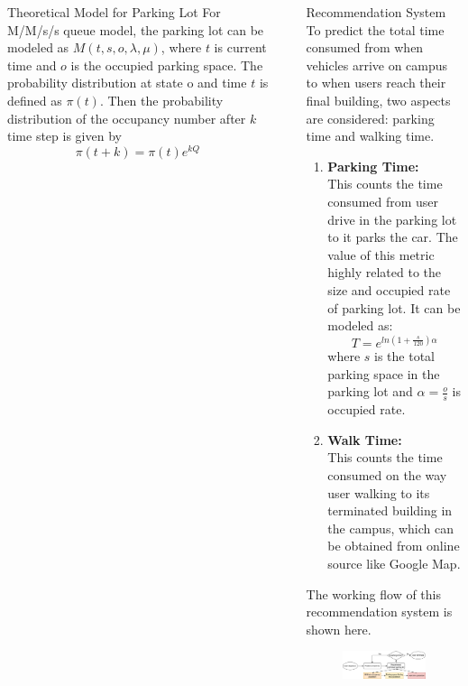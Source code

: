 \documentclass[final, xcolor={table,dvipsnames},t]{beamer}
\newlength{\sepwidth}
\newlength{\colwidth}
\newcommand{\separatorcolumn}{\begin{column}{\sepwidth}\end{column}}
\begin{document}
\begin{frame}[t]
\begin{columns}[t]
\begin{column}{\colwidth}
\begin{alertblock}{Theoretical Model for Parking Lot}
    For M/M/s/s queue model, the parking lot can be modeled as $M(t,s,o,\lambda,\mu)$, where $t$ is current time and $o$ is the occupied parking space\cite{finding}. The probability distribution at state o and time $t$ is defined as $\pi(t)$. Then the probability distribution of the occupancy number after $k$ time step is given by
    \begin{equation*}
        \pi (t + k) = \pi (t) e^{kQ}
    \end{equation*}
    

  \end{alertblock}

\end{column}

\separatorcolumn

\begin{column}{\colwidth}

  \begin{block}{Recommendation System}
    To predict the total time consumed from when vehicles arrive on campus to when users reach their final building, two aspects are considered: parking time and walking time. 

    \begin{enumerate}
      \item \textbf{Parking Time:}\\ This counts the time consumed from user drive in the parking lot to it parks the car. The value of this metric highly related to the size and occupied rate of parking lot. It can be modeled as:
      \begin{equation*}
          T = e^{ln(1 + \frac{s}{120})\alpha}
      \end{equation*}
      where $s$ is the total parking space in the parking lot and $\alpha = \frac{o}{s}$ is occupied rate. 
      \item \textbf{Walk Time:}\\ This counts the time consumed on the way user walking to its terminated building in the campus, which can be obtained from online source like Google Map.
    \end{enumerate}

    The working flow of this recommendation system is shown here.
    \begin{figure}[H]
	\centering
	\includegraphics[scale=2]{ECE514.png}
	\label{work flow}
    \end{figure}


\end{block}
\end{column}
\end{columns}
\end{frame}
\end{document}
